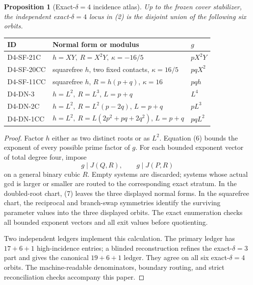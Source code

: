 \documentclass[11pt]{article}
\newtheorem{proposition}[theorem]{Proposition}
\begin{document}
\begin{proposition}[Exact-\(\delta=4\) incidence atlas]\label{prop:atlas}
Up to the frozen cover stabilizer, the independent exact-\(\delta=4\)
locus in \emph{(2)} is the disjoint union of the following six orbits.
\end{proposition}

\begin{center}
\small
\begin{tabular}{@{}>{\ttfamily}l p{} l@{}}
\toprule
\normalfont ID & \normalfont Normal form or modulus & \normalfont \(g\)\\
\midrule
D4-SF-21C  & \(h=XY,\ R=X^2Y,\ \kappa=-16/5\) & \(pX^2Y\)\\
D4-SF-20CC & squarefree \(h\), two fixed contacts, \(\kappa=16/5\)
            & \(pqX^2\)\\
D4-SF-11CC & squarefree \(h\), \(R=h(p+q)\), \(\kappa=16\)
            & \(pqh\)\\
D4-DN-3    & \(h=L^2,\ R=L^3\), \(L=p+q\) & \(L^4\)\\
D4-DN-2C   & \(h=L^2,\ R=L^2(p-2q)\), \(L=p+q\) & \(pL^3\)\\
D4-DN-1CC  & \(h=L^2,\ R=L(2p^2+pq+2q^2)\), \(L=p+q\)
            & \(pqL^2\)\\
\bottomrule
\end{tabular}
\end{center}

\begin{proof}
Factor \(h\) either as two distinct roots or as \(L^2\).  Equation (6)
bounds the exponent of every possible prime factor of \(g\).  For each
bounded exponent vector of total degree four, impose
\[
g\mid J(Q,R),\qquad g\mid J(P,R)
\tag{7}
\]
on a general binary cubic \(R\).  Empty systems are discarded; systems
whose actual gcd is larger or smaller are routed to the corresponding
exact stratum.  In the doubled-root chart, (7) leaves the three displayed
normal forms.  In the squarefree chart, the reciprocal and branch-swap
symmetries identify the surviving parameter values into the three
displayed orbits.  The exact enumeration checks all bounded exponent
vectors and all exit values before quotienting.

Two independent ledgers implement this calculation.  The primary ledger
has \(17+6+1\) high-incidence entries; a blinded reconstruction refines
the exact-\(\delta=3\) part and gives the canonical \(19+6+1\) ledger.
They agree on all six exact-\(\delta=4\) orbits.  The machine-readable
denominators, boundary routing, and strict reconciliation checks accompany
this paper.
\end{proof}
\end{document}
